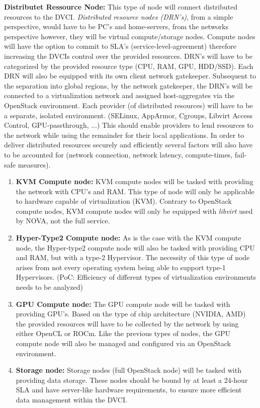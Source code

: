 \documentclass[]{article}
\begin{document}
\textbf{Distributet Ressource Node:}
This type of node will connect distributed resources to the DVCI. 
\textit{Distributed resource nodes (DRN's)}, from a simple perspective, would have to be PC's and home-servers, from the networks perspective however, they will be virtual compute/storage nodes.
Compute nodes will have the option to commit to SLA's (service-level-agreement) therefore increasing the DVCIs control over the provided resources.
DRN's will have to be categorized by the provided resource type (CPU, RAM, GPU, HDD/SSD).
Each DRN will also be equipped with its own client network gatekeeper.
Subsequent to the separation into global regions, by the network gatekeeper, the DRN's will be connected to a virtualization network and assigned host-aggregates via the OpenStack environment.
Each provider (of distributed resources) will have to be a separate, isolated environment. (SELinux, AppArmor, Cgroups, Libvirt Access Control, GPU-passthrough, ...) 
This should enable providers to lend resources to the network while using the remainder for their local applications. 
In order to deliver distributed resources securely and efficiently several factors will also have to be accounted for (network connection, network latency, compute-times, fail-safe measures).  

\begin{enumerate}[label=\textbullet]
	\item \textbf{KVM Compute node:}
    KVM compute nodes will be tasked with providing the network with CPU's and RAM. 
    This type of node will only be applicable to hardware capable of virtualization (KVM).
    Contrary to OpenStack compute nodes, KVM compute nodes will only be equipped with \textit{libvirt} used by NOVA, not the full service. 
			
	\item \textbf{Hyper-Type2 Compute node:}
	As is the case with the KVM compute node, the Hyper-type2 compute node will also be tasked with providing CPU and RAM, but with a type-2 Hypervisor.
	The necessity of this type of node arises from not every operating system being able to support type-1 Hypervisors.
	(PoC: Efficiency of different types of virtualization environments needs to be analyzed) 
	
	\item \textbf{GPU Compute node:}
	The GPU compute node will be tasked with providing GPU's.
	Based on the type of chip architecture (NVIDIA, AMD) the provided resources will have to be collected by the network by using either OpenCL or ROCm.
	Like the previous types of nodes, the GPU compute node will also be managed and configured via an OpenStack environment. 
		
	\item \textbf{Storage node:}
	Storage nodes (full OpenStack node) will be tasked with providing data storage. 
	These nodes should be bound by at least a 24-hour SLA and have server-like hardware requirements, to ensure more efficient data management within the DVCI.  
\end{enumerate}
\end{document}

